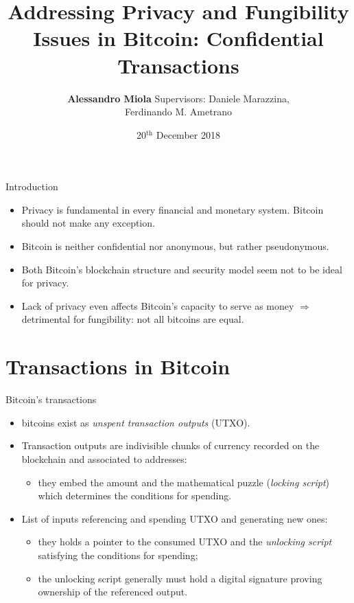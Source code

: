 \documentclass[usenames,dvipsnames]{beamer}
\title{Addressing Privacy and Fungibility Issues in Bitcoin: Confidential Transactions}
\date{20$^{\text{th}}$ December 2018}
\author{\textbf{Alessandro Miola} \qquad \qquad \qquad 
Supervisors: Daniele Marazzina,\\ \hspace*{6.78cm} Ferdinando M. Ametrano}
\begin{document}

    \begin{frame}
        \maketitle
    \end{frame}
    
    \begin{frame}{Introduction}
        \begin{itemize}
            \item Privacy is fundamental in every financial and monetary system. Bitcoin should not make any exception.
            \item Bitcoin is neither confidential nor anonymous, but rather pseudonymous.
            \item Both Bitcoin's blockchain structure and security model seem not to be ideal for privacy.
            \item Lack of privacy even affects Bitcoin's capacity to serve as money $\Rightarrow$ detrimental for fungibility: not all bitcoins are equal.
        \end{itemize}
    \end{frame}
    
    \section{Transactions in Bitcoin}
    \begin{frame}{Bitcoin's transactions}
        \begin{itemize}
            \item bitcoins exist as \textit{unspent transaction outputs} (UTXO).
            \item Transaction \color{red}outputs \color{black}are indivisible chunks of currency recorded on the blockchain and associated to addresses:
            \begin{itemize}
                \item they embed the amount and the mathematical puzzle (\textit{locking script}) which determines the conditions for spending.
            \end{itemize}
            \item List of \color{blue}inputs \color{black} referencing and spending UTXO and generating new ones:
            \begin{itemize}
                \item they holds a pointer to the consumed UTXO and the \textit{unlocking script} satisfying the conditions for spending;
                \item the unlocking script generally must hold a digital signature proving ownership of the referenced output.
            \end{itemize}
        \end{itemize}
    \end{frame}
    
\end{document}
